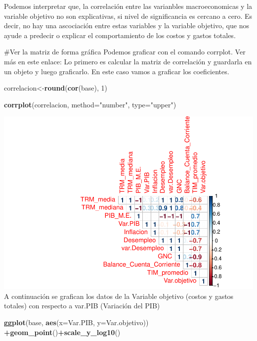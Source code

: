 \documentclass[
  11pt,
]{book}
\newenvironment{Shaded}{\begin{snugshade}}{\end{snugshade}}
\newcommand{\DataTypeTok}[1]{\textcolor[rgb]{0.13,0.29,0.53}{#1}}
\newcommand{\DecValTok}[1]{\textcolor[rgb]{0.00,0.00,0.81}{#1}}
\newcommand{\KeywordTok}[1]{\textcolor[rgb]{0.13,0.29,0.53}{\textbf{#1}}}
\newcommand{\NormalTok}[1]{#1}
\newcommand{\OperatorTok}[1]{\textcolor[rgb]{0.81,0.36,0.00}{\textbf{#1}}}
\newcommand{\StringTok}[1]{\textcolor[rgb]{0.31,0.60,0.02}{#1}}
\begin{document}
Podemos interpretar que, la correlación entre las varianbles
macroeconomicas y la variable objetivo no son explicativas, si nivel de
significancia es cercano a cero. Es decir, no hay una ascociación entre
estas variables y la variable objetivo, que nos ayude a predecir o
explicar el comportamiento de los costos y gastos totales.

\#Ver la matriz de forma gráfica Podemos graficar con el comando
corrplot. Ver más en este enlace: Lo primero es calcular la matriz de
correlación y guardarla en un objeto y luego graficarlo. En este caso
vamos a graficar los coeficientes.

\begin{Shaded}
\begin{Highlighting}[]
\NormalTok{correlacion<-}\KeywordTok{round}\NormalTok{(}\KeywordTok{cor}\NormalTok{(base), }\DecValTok{1}\NormalTok{)}

\KeywordTok{corrplot}\NormalTok{(correlacion, }\DataTypeTok{method=}\StringTok{"number"}\NormalTok{, }\DataTypeTok{type=}\StringTok{"upper"}\NormalTok{)}
\end{Highlighting}
\end{Shaded}

\includegraphics{index_files/figure-latex/unnamed-chunk-43-1.pdf} A
continuación se grafican los datos de la Variable objetivo (costos y
gastos totales) con respecto a var.PIB (Variación del PIB)

\begin{Shaded}
\begin{Highlighting}[]
\KeywordTok{ggplot}\NormalTok{(base, }\KeywordTok{aes}\NormalTok{(}\DataTypeTok{x=}\NormalTok{Var.PIB, }\DataTypeTok{y=}\NormalTok{Var.objetivo)) }\OperatorTok{+}\KeywordTok{geom_point}\NormalTok{()}\OperatorTok{+}\KeywordTok{scale_y_log10}\NormalTok{()}
\end{Highlighting}
\end{Shaded}
\end{document}
